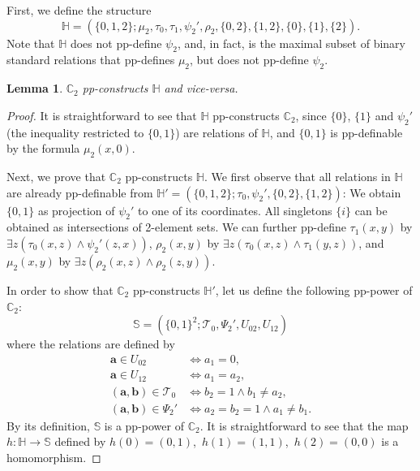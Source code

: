 \documentclass[12pt]{amsart}
\newtheorem{lemma}[theorem]{Lemma}
\theoremstyle{definition}
\theoremstyle{definition}
\newcommand{\struct}[1]{\mathbb{#1}}
\begin{document}
First, we define the structure 
\[\mathbb H = (\{0,1,2\}; \mu_2, \tau_0,\tau_1, \psi_2', \rho_2, \{0,2\}, \{1,2\}, \{0\},\{1\},\{2\}).
\] 
Note that $\mathbb H$ does not pp-define $\psi_2$, and, in fact, is the maximal subset of binary standard relations that pp-defines $\mu_2$, but does not pp-define $\psi_2$.

\begin{lemma} \label{lemma:Hppconstruction}
$\mathbb C_2$ pp-constructs $\mathbb H$ and vice-versa. 
\end{lemma}

\begin{proof}
It is straightforward to see that $\mathbb H$ pp-constructs $\mathbb C_2$, since $\{0\}$, $\{1\}$ and $\psi_2'$ (the inequality restricted to $\{0,1\}$) are relations of $\mathbb H$, and $\{0,1\}$ is pp-definable by the formula $\mu_2(x,0)$.

Next, we prove that $\mathbb C_2$ pp-constructs $\mathbb H$. We first observe that all relations in $\struct{H}$ are already pp-definable from $\mathbb H'= (\{0,1,2\}; \tau_0,\psi_2', \{0,2\}, \{1,2\})$: We obtain $\{0,1\}$ as projection of $\psi_2'$ to one of its coordinates. All singletons $\{i\}$ can be obtained as intersections of 2-element sets. We can further pp-define $\tau_1(x,y)$ by $\exists z (\tau_0(x,z) \land \psi_2'(z,x))$, $\rho_2(x,y)$ by $\exists z (\tau_0(x,z) \land \tau_1(y,z))$, and $\mu_2(x,y)$ by $\exists z (\rho_2(x,z) \land \rho_2(z,y))$.

In order to show that $\mathbb C_2$ pp-constructs $\mathbb H'$, let us define the following pp-power of $\mathbb C_2$:
$$\mathbb S = (\{0,1\}^2; \mathcal{T}_0,\Psi_2', U_{02}, U_{12})$$ where the relations are defined by
\begin{align*}
\boldsymbol{a} \in U_{02}& \Leftrightarrow a_1=0,\\
\boldsymbol{a} \in U_{12}& \Leftrightarrow a_1 = a_2,\\
(\boldsymbol{a},\boldsymbol{b}) \in \mathcal{T}_0& \Leftrightarrow
b_2 = 1 \wedge b_1 \neq a_2,\\
(\boldsymbol{a},\boldsymbol{b}) \in \Psi_2'& \Leftrightarrow a_2 = b_2 =1 \wedge  a_1 \neq b_1.
\end{align*}
By its definition, $\mathbb S$ is a pp-power of $\mathbb C_2$. It is straightforward to see that the map $h \colon \mathbb H \to \mathbb S$ defined by $h(0) = (0,1)$,\ $h(1) = (1,1)$,\ $h(2) = (0,0)$ is a homomorphism.


\end{proof}
\end{document}
